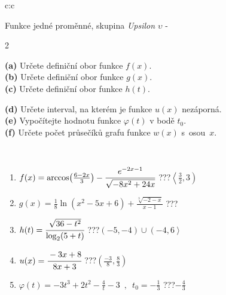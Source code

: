 \documentclass[10pt]{report}
\begin{document}
\begin{tabular}{c:c}
\begin{minipage}[c][104.5mm][t]{0.5\linewidth}
\begin{center}
\vspace{7mm}
{\huge Funkce jedné proměnné, skupina \textit{Upsilon $\upsilon$} -}\\[5mm]
\begin{minipage}{0.95\linewidth}
\begin{center}
{\small \begin{multicols}{2} \raggedright
\textbf{(a)} Určete definiční obor funkce \(f(x)\). \\[1mm]
\textbf{(b)} Určete definiční obor funkce \(g(x)\). \\[1mm]
\textbf{(c)} Určete definiční obor funkce \(h(t)\). \par \columnbreak
\textbf{(d)} Určete interval, na kterém je funkce \(u(x)\) nezáporná. \\[1mm]
\textbf{(e)} Vypočítejte hodnotu funkce \(\varphi(t)\) v bodě \(t_0\). \\[1mm]
\textbf{(f)} Určete počet průsečíků grafu funkce \(w(x)\) s~osou~\(x\). \\[1mm]
\end{multicols}
}
\end{center}
\end{minipage}
\\[4mm]
\begin{minipage}{0.79\linewidth}
\begin{center}
\begin{varwidth}{\linewidth}
\begin{enumerate}
\small
\item $f(x) = \arccos\!\left( \frac{6-2x}{3} \right) - \cfrac{e^{-2x-1}}{\sqrt{-8x^2+24x}}$\quad \dotfill\; ???\;\dotfill \quad $\left\langle\frac{3}{2} , 3\right)$
\item $g(x) = \frac{1}{8} \ln{\!(x^2-5x+6)}+\frac{\sqrt[3]{-2-x}}{x-1}$\quad \dotfill\; ???\;\dotfill {}
\item $h(t) = \cfrac{\sqrt{36-t^2}}{\log_2(5+t)}$\quad \dotfill\; ???\;\dotfill \quad $\left(-5 , -4\right)\cup\left(-4 , 6\right\rangle$
\item $u(x) = \cfrac{-3x+8}{8x+3}$\quad \dotfill\; ???\;\dotfill \quad $\left(\frac{-3}{8} , \frac{8}{3}\right)$
\item $\varphi(t) = -3t^3+2t^2-\frac{4}{t}-3 \enspace , \enspace t_0=-\frac{1}{3}$\quad \dotfill\; ???\;\dotfill \quad $-\frac{4}{3}$

\end{enumerate}
\end{varwidth}
\end{center}
\end{minipage}
\end{center}
\end{minipage}
\end{tabular}
\end{document}
